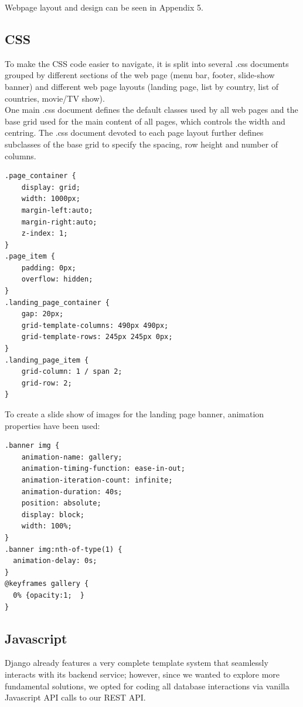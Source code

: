 \documentclass[letterpaper,twocolumn]{article}
\begin{document}
Webpage layout and design can be seen in Appendix 5.


\subsection{CSS}

To make the CSS code easier to navigate, it is split into several .css documents grouped by different sections of the web page (menu bar, footer, slide-show banner) and different web page layouts (landing page, list by country, list of countries, movie/TV show). \\

One main .css document defines the default classes used by all web pages and the base grid used for the main content of all pages, which controls the width and centring. The .css document devoted to each page layout further defines subclasses of the base grid to specify the spacing, row height and number of columns. 

\begin{verbatim}
.page_container {
	display: grid;
	width: 1000px;
	margin-left:auto;
	margin-right:auto;
	z-index: 1;
}
.page_item {
	padding: 0px;
	overflow: hidden;
}
.landing_page_container {
	gap: 20px;
	grid-template-columns: 490px 490px;
	grid-template-rows: 245px 245px 0px;
}
.landing_page_item {
	grid-column: 1 / span 2;
	grid-row: 2;
}
\end{verbatim}
To create a slide show of images for the landing page banner, animation properties have been used:

\begin{verbatim}
.banner img {
	animation-name: gallery;
	animation-timing-function: ease-in-out;
	animation-iteration-count: infinite;
	animation-duration: 40s;
	position: absolute;
	display: block;
	width: 100%;
}
.banner img:nth-of-type(1) {
  animation-delay: 0s;
}
@keyframes gallery {
  0% {opacity:1;  }
}
\end{verbatim}

\subsection{Javascript}

Django already features a very complete template system that seamlessly interacts with its backend service; however, since we wanted to explore more fundamental solutions, we opted for coding all database interactions via vanilla Javascript API calls to our REST API.\\
\end{document}
